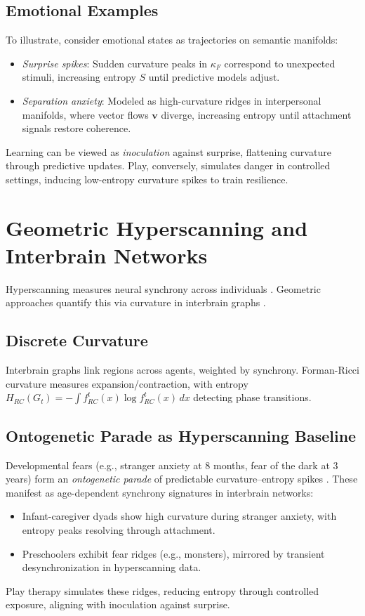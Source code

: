\documentclass{article}
\theoremstyle{definition}
\begin{document}
\subsection{Emotional Examples}
To illustrate, consider emotional states as trajectories on semantic manifolds:
\begin{itemize}
  \item \emph{Surprise spikes}: Sudden curvature peaks in $\kappa_F$ correspond to unexpected stimuli, increasing entropy $S$ until predictive models adjust.
  \item \emph{Separation anxiety}: Modeled as high-curvature ridges in interpersonal manifolds, where vector flows $\mathbf{v}$ diverge, increasing entropy until attachment signals restore coherence.
\end{itemize}

Learning can be viewed as \emph{inoculation} against surprise, flattening curvature through predictive updates. Play, conversely, simulates danger in controlled settings, inducing low-entropy curvature spikes to train resilience.

\section{Geometric Hyperscanning and Interbrain Networks}
Hyperscanning measures neural synchrony across individuals \cite{montague2002hyperscanning}. Geometric approaches quantify this via curvature in interbrain graphs \cite{hinrichs2025geometry}.

\subsection{Discrete Curvature}
Interbrain graphs link regions across agents, weighted by synchrony. Forman-Ricci curvature measures expansion/contraction, with entropy $H_{RC}(G_t) = -\int f^t_{RC}(x) \log f^t_{RC}(x) \, dx$ detecting phase transitions.

\subsection{Ontogenetic Parade as Hyperscanning Baseline}
Developmental fears (e.g., stranger anxiety at 8 months, fear of the dark at 3 years) form an \emph{ontogenetic parade} of predictable curvature–entropy spikes \cite{marks2024developmental}. These manifest as age-dependent synchrony signatures in interbrain networks:
\begin{itemize}
  \item Infant-caregiver dyads show high curvature during stranger anxiety, with entropy peaks resolving through attachment.
  \item Preschoolers exhibit fear ridges (e.g., monsters), mirrored by transient desynchronization in hyperscanning data.
\end{itemize}
Play therapy simulates these ridges, reducing entropy through controlled exposure, aligning with inoculation against surprise.
\end{document}
